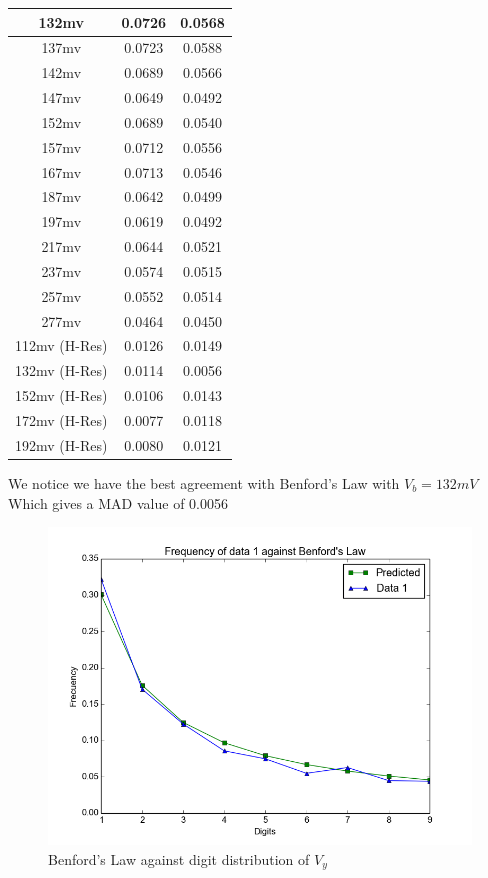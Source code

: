 \begin{itemize}
\begin{center}
\begin{tabular}{ c | c | c }
            132mv & 0.0726 & 0.0568  \\ \hline
            137mv & 0.0723 & 0.0588  \\ \hline
            142mv & 0.0689 & 0.0566  \\ \hline
            147mv & 0.0649 & 0.0492  \\ \hline
            152mv & 0.0689 & 0.0540  \\ \hline
            157mv & 0.0712 & 0.0556   \\ \hline
            167mv & 0.0713 & 0.0546  \\ \hline
            187mv & 0.0642 & 0.0499  \\ \hline
            197mv & 0.0619 & 0.0492  \\ \hline
            217mv & 0.0644 & 0.0521  \\ \hline
            237mv & 0.0574 & 0.0515  \\ \hline
            257mv & 0.0552 & 0.0514  \\ \hline
            277mv & 0.0464 & 0.0450  \\ \hline
            112mv (H-Res) & 0.0126 & 0.0149  \\ \hline
            132mv  (H-Res)& 0.0114 & 0.0056  \\ \hline
            152mv  (H-Res)& 0.0106 & 0.0143  \\ \hline
            172mv  (H-Res)& 0.0077 & 0.0118  \\ \hline
            192mv  (H-Res)& 0.0080 & 0.0121  \\ \hline

        \end{tabular}
    \end{center}

We notice we have the best agreement with Benford's Law with $V_b=132mV$ Which gives a MAD value of 0.0056

            \begin{figure}[h]
            \centering
            \includegraphics[scale=0.4]{imagenes/2-benford/benford_shilnikov_1.png}
            \caption{Benford's Law against digit distribution of $V_y$}
            \end{figure}


\end{itemize}
